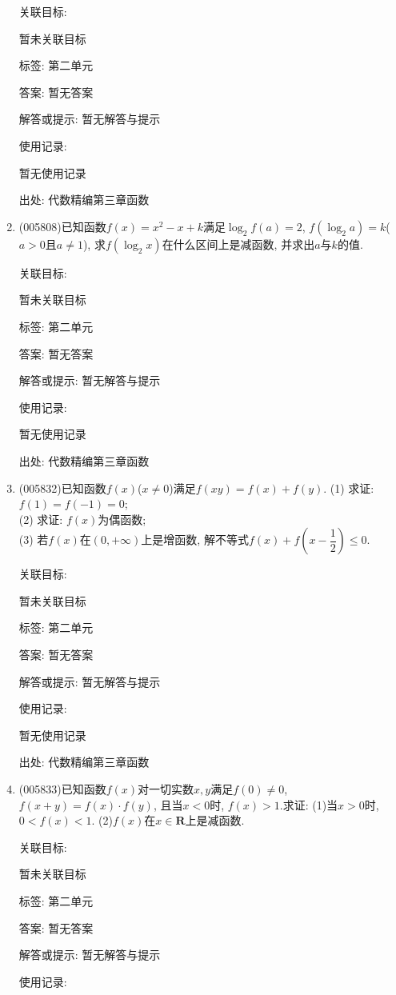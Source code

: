 \documentclass[10pt,a4paper]{article}
\begin{document}
\begin{enumerate}[1.]
关联目标:

暂未关联目标



标签: 第二单元

答案: 暂无答案

解答或提示: 暂无解答与提示

使用记录:

暂无使用记录


出处: 代数精编第三章函数
\item { (005808)}已知函数$f(x)=x^2-x+k$满足$\log_2f(a)=2$, $f(\log_2a)=k$($a>0$且$a\ne 1$), 求$f(\log_2x)$在什么区间上是减函数, 并求出$a$与$k$的值.


关联目标:

暂未关联目标



标签: 第二单元

答案: 暂无答案

解答或提示: 暂无解答与提示

使用记录:

暂无使用记录


出处: 代数精编第三章函数
\item { (005832)}已知函数$f(x)$($x\ne 0$)满足$f(xy)=f(x)+f(y)$.
(1) 求证: $f(1)=f(-1)=0$;\\
(2) 求证: $f(x)$为偶函数;\\
(3) 若$f(x)$在$(0,+\infty)$上是增函数, 解不等式$f(x)+f(x-\dfrac 12)\le 0$.


关联目标:

暂未关联目标



标签: 第二单元

答案: 暂无答案

解答或提示: 暂无解答与提示

使用记录:

暂无使用记录


出处: 代数精编第三章函数
\item { (005833)}已知函数$f(x)$对一切实数$x,y$满足$f(0)\ne 0$, $f(x+y)=f(x)\cdot f(y)$, 且当$x<0$时, $f(x)>1$.求证:
(1)当$x>0$时, $0<f(x)<1$.
(2)$f(x)$在$x\in \mathbf{R}$上是减函数.


关联目标:

暂未关联目标



标签: 第二单元

答案: 暂无答案

解答或提示: 暂无解答与提示

使用记录:


\end{enumerate}
\end{document}
